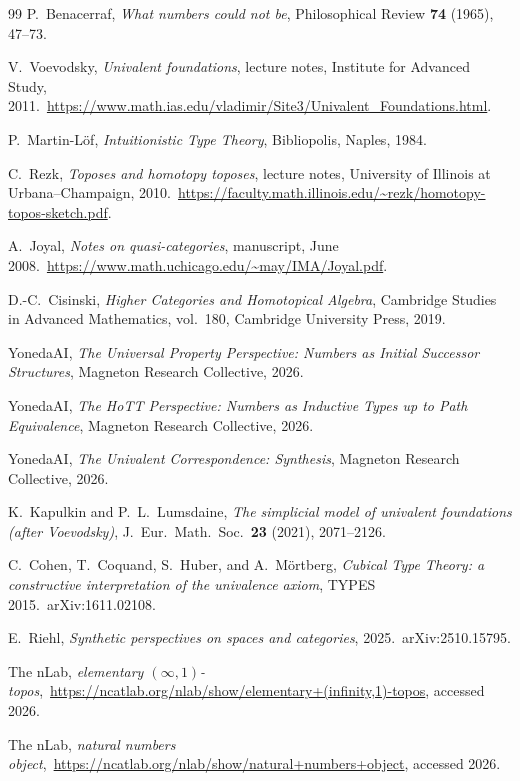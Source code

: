 \documentclass[12pt]{article}
\theoremstyle{definition}
\theoremstyle{remark}
\begin{document}
\begin{thebibliography}{99}
 P.~Benacerraf, \emph{What numbers could not be}, Philosophical Review \textbf{74} (1965), 47--73.

 V.~Voevodsky, \emph{Univalent foundations}, lecture notes, Institute for Advanced Study, 2011.\ \url{https://www.math.ias.edu/vladimir/Site3/Univalent_Foundations.html}.

 P.~Martin-L\"of, \emph{Intuitionistic Type Theory}, Bibliopolis, Naples, 1984.

 C.~Rezk, \emph{Toposes and homotopy toposes}, lecture notes, University of Illinois at Urbana--Champaign, 2010.\ \url{https://faculty.math.illinois.edu/~rezk/homotopy-topos-sketch.pdf}.

 A.~Joyal, \emph{Notes on quasi-categories}, manuscript, June 2008.\ \url{https://www.math.uchicago.edu/~may/IMA/Joyal.pdf}.

 D.-C.~Cisinski, \emph{Higher Categories and Homotopical Algebra}, Cambridge Studies in Advanced Mathematics, vol.~180, Cambridge University Press, 2019.

 YonedaAI, \emph{The Universal Property Perspective: Numbers as Initial Successor Structures}, Magneton Research Collective, 2026.

 YonedaAI, \emph{The HoTT Perspective: Numbers as Inductive Types up to Path Equivalence}, Magneton Research Collective, 2026.

 YonedaAI, \emph{The Univalent Correspondence: Synthesis}, Magneton Research Collective, 2026.

 K.~Kapulkin and P.~L.~Lumsdaine, \emph{The simplicial model of univalent foundations (after Voevodsky)}, J.\ Eur.\ Math.\ Soc.\ \textbf{23} (2021), 2071--2126.

 C.~Cohen, T.~Coquand, S.~Huber, and A.~M\"ortberg, \emph{Cubical Type Theory: a constructive interpretation of the univalence axiom}, TYPES 2015.\ arXiv:1611.02108.

 E.~Riehl, \emph{Synthetic perspectives on spaces and categories}, 2025.\ arXiv:2510.15795.

 The nLab, \emph{elementary $(\infty,1)$-topos},\ \url{https://ncatlab.org/nlab/show/elementary+(infinity,1)-topos}, accessed 2026.

 The nLab, \emph{natural numbers object},\ \url{https://ncatlab.org/nlab/show/natural+numbers+object}, accessed 2026.

\end{thebibliography}
\end{document}
